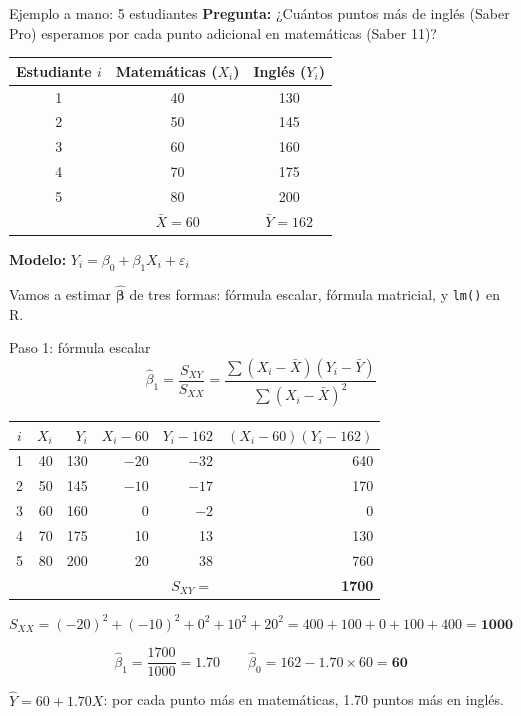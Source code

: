 \documentclass[aspectratio=169, 11pt]{beamer}
\begin{document}

\begin{frame}{Ejemplo a mano: 5 estudiantes}
\small
\textbf{Pregunta:} ¿Cuántos puntos más de inglés (Saber Pro) esperamos por cada punto adicional en matemáticas (Saber 11)?

\vspace{0.2cm}
\begin{center}
\begin{tabular}{ccc}
\toprule
Estudiante $i$ & Matemáticas ($X_i$) & Inglés ($Y_i$) \\
\midrule
1 & 40 & 130 \\
2 & 50 & 145 \\
3 & 60 & 160 \\
4 & 70 & 175 \\
5 & 80 & 200 \\
\midrule
& $\bar{X} = 60$ & $\bar{Y} = 162$ \\
\bottomrule
\end{tabular}
\end{center}

\vspace{0.2cm}
\textbf{Modelo:} $Y_i = \beta_0 + \beta_1 X_i + \varepsilon_i$

Vamos a estimar $\hat{\boldsymbol{\beta}}$ de tres formas: fórmula escalar, fórmula matricial, y \texttt{lm()} en R.
\end{frame}


\begin{frame}{Paso 1: fórmula escalar}
\small
\[
\hat{\beta}_1 = \frac{S_{XY}}{S_{XX}} = \frac{\sum(X_i - \bar{X})(Y_i - \bar{Y})}{\sum(X_i - \bar{X})^2}
\]

\begin{center}
\footnotesize
\begin{tabular}{crrrrr}
\toprule
$i$ & $X_i$ & $Y_i$ & $X_i - 60$ & $Y_i - 162$ & $(X_i{-}60)(Y_i{-}162)$ \\
\midrule
1 & 40 & 130 & $-20$ & $-32$ & 640 \\
2 & 50 & 145 & $-10$ & $-17$ & 170 \\
3 & 60 & 160 & 0 & $-2$ & 0 \\
4 & 70 & 175 & 10 & 13 & 130 \\
5 & 80 & 200 & 20 & 38 & 760 \\
\midrule
& & & & $S_{XY} =$ & \textbf{1700} \\
\bottomrule
\end{tabular}
\end{center}

$S_{XX} = (-20)^2 + (-10)^2 + 0^2 + 10^2 + 20^2 = 400 + 100 + 0 + 100 + 400 = \mathbf{1000}$

\[
\hat{\beta}_1 = \frac{1700}{1000} = \mathbf{1.70} \qquad \hat{\beta}_0 = 162 - 1.70 \times 60 = \mathbf{60}
\]

$\hat{Y} = 60 + 1.70 X$: por cada punto más en matemáticas, 1.70 puntos más en inglés.
\end{frame}
\end{document}
